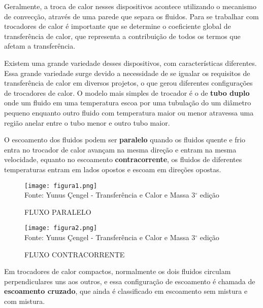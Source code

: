 \documentclass[a4paper,12pt,oneside]{article}
\begin{document}
\begin{flushright}
Geralmente, a troca de calor nesses dispositivos acontece utilizando o mecanismo de convecção, através de uma parede que separa os fluidos. Para se trabalhar com trocadores de calor é importante que se determine o coeficiente global de transferência de calor, que representa a contribuição de todos os termos que afetam a transferência.

Existem uma grande variedade desses dispositivos, com características diferentes. Essa grande variedade surge devido a necessidade de se igualar os requisitos de transferência de calor em diversos projetos, o que gerou diferentes configurações de trocadores de calor. O modelo mais simples de trocador é o de \textbf{tubo duplo} onde um fluido em uma temperatura escoa por uma tubulação do um diâmetro pequeno enquanto outro fluido com temperatura maior ou menor atravessa uma região anelar entre o tubo menor e outro tubo maior. 

O escoamento dos fluidos podem ser \textbf{paralelo} quando os fluidos quente e frio entra no trocador de calor avançam na mesma direção e entram na mesma velocidade, equanto no escoamento \textbf{contracorrente}, os fluidos de diferentes temperaturas entram em lados opostos e escoam em direções opostas.

\pagebreak
\clearpage
\newpage


\begin{figure}[h]
	\centering
	\caption{FLUXO PARALELO}
	\vspace{0.5cm}
	\texttt{[image: figura1.png]}
	\vspace{0.5cm}\\
	Fonte: Yunus Çengel - Transferência e Calor e Massa 3$^\circ$ edição
\end{figure}
\vspace{0.5cm}

\begin{figure}[h]
	\centering
	\caption{FLUXO CONTRACORRENTE}
	\vspace{0.5cm}
	\texttt{[image: figura2.png]}
	\vspace{0.5cm}\\
	Fonte: Yunus Çengel - Transferência e Calor e Massa 3$^\circ$ edição
\end{figure}
\vspace{0.5cm}

Em trocadores de calor compactos, normalmente os dois fluidos circulam perpendiculares uns aos outros, e essa configuração de escoamento é chamada de \textbf{escoamento cruzado}, que ainda é classificado em escoamento sem mistura e com mistura.


\end{flushright}
\end{document}
